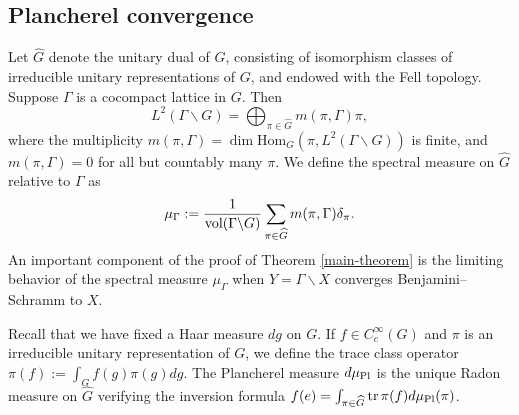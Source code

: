 \documentclass[12pt]{amsart}
\theoremstyle{remark}
\newcommand{\Hom}{\text{Hom}}
\begin{document}
\subsection{Plancherel convergence}\label{sec:limit-mult}
Let $\widehat{G}$ denote the unitary dual of $G$, consisting of isomorphism classes of irreducible unitary representations of $G$, and endowed with the Fell topology. Suppose $\Gamma$ is a cocompact lattice in $G$. Then
\begin{equation}\label{eq:spec-decomp}
    L^2(\Gamma \backslash G) = \bigoplus_{\pi \in \widehat{G}} m(\pi,\Gamma)\pi,
\end{equation}
where the multiplicity $m(\pi,\Gamma)=\dim\Hom_G(\pi,L^2(\Gamma\backslash G))$ is finite, and $m(\pi,\Gamma)=0$ for all but countably many $\pi$. We define the spectral measure on $\widehat{G}$ relative to $\Gamma$ as
\begin{gather*}
    \mu_\Gamma := \frac{1}{\textnormal{vol}(\Gamma \backslash G)} \sum_{\pi \in \widehat{G}} m(\pi,\Gamma) \delta_{\pi}.
\end{gather*}
An important component of the proof of Theorem \ref{main-theorem} is the limiting behavior of the spectral measure $\mu_\Gamma$ when $Y=\Gamma\backslash X$ converges Benjamini--Schramm to $X$.

Recall that we have fixed a Haar measure $dg$ on $G$. If $f \in C_c^\infty(G)$ and $\pi$ is an irreducible unitary representation of $G$, we define the trace class operator $\pi(f) := \int_{G} f(g) \pi(g) dg$. The Plancherel measure $d\mu_{\rm Pl}$ is the unique Radon measure on $\widehat{G}$ verifying the inversion formula $f(e)=\int_{\pi\in\widehat{G}}{\rm tr}\, \pi(f)d\mu_{\rm Pl}(\pi)$.
\end{document}
